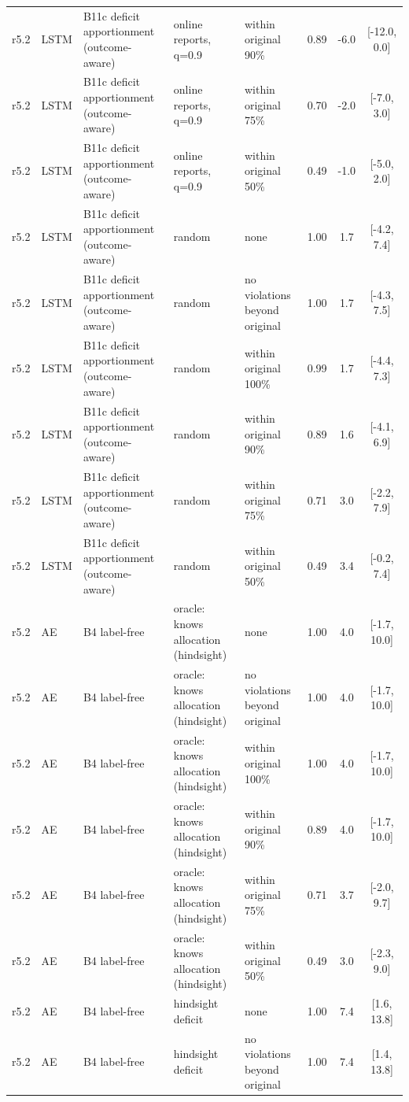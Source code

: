 \documentclass[10pt,onecolumn,letterpaper]{article}
\begin{document}
\begin{longtable}{lllp{4.2cm}p{3.4cm}ccc}
r5.2 & LSTM & B11c deficit apportionment (outcome-aware) & online reports, q=0.9 & within original 90\% & 0.89 & -6.0 & [-12.0, 0.0] \\
r5.2 & LSTM & B11c deficit apportionment (outcome-aware) & online reports, q=0.9 & within original 75\% & 0.70 & -2.0 & [-7.0, 3.0] \\
r5.2 & LSTM & B11c deficit apportionment (outcome-aware) & online reports, q=0.9 & within original 50\% & 0.49 & -1.0 & [-5.0, 2.0] \\
r5.2 & LSTM & B11c deficit apportionment (outcome-aware) & random & none & 1.00 & 1.7 & [-4.2, 7.4] \\
r5.2 & LSTM & B11c deficit apportionment (outcome-aware) & random & no violations beyond original & 1.00 & 1.7 & [-4.3, 7.5] \\
r5.2 & LSTM & B11c deficit apportionment (outcome-aware) & random & within original 100\% & 0.99 & 1.7 & [-4.4, 7.3] \\
r5.2 & LSTM & B11c deficit apportionment (outcome-aware) & random & within original 90\% & 0.89 & 1.6 & [-4.1, 6.9] \\
r5.2 & LSTM & B11c deficit apportionment (outcome-aware) & random & within original 75\% & 0.71 & 3.0 & [-2.2, 7.9] \\
r5.2 & LSTM & B11c deficit apportionment (outcome-aware) & random & within original 50\% & 0.49 & 3.4 & [-0.2, 7.4] \\
r5.2 & AE & B4 label-free & oracle: knows allocation (hindsight) & none & 1.00 & 4.0 & [-1.7, 10.0] \\
r5.2 & AE & B4 label-free & oracle: knows allocation (hindsight) & no violations beyond original & 1.00 & 4.0 & [-1.7, 10.0] \\
r5.2 & AE & B4 label-free & oracle: knows allocation (hindsight) & within original 100\% & 1.00 & 4.0 & [-1.7, 10.0] \\
r5.2 & AE & B4 label-free & oracle: knows allocation (hindsight) & within original 90\% & 0.89 & 4.0 & [-1.7, 10.0] \\
r5.2 & AE & B4 label-free & oracle: knows allocation (hindsight) & within original 75\% & 0.71 & 3.7 & [-2.0, 9.7] \\
r5.2 & AE & B4 label-free & oracle: knows allocation (hindsight) & within original 50\% & 0.49 & 3.0 & [-2.3, 9.0] \\
r5.2 & AE & B4 label-free & hindsight deficit & none & 1.00 & 7.4 & [1.6, 13.8] \\
r5.2 & AE & B4 label-free & hindsight deficit & no violations beyond original & 1.00 & 7.4 & [1.4, 13.8] \\

\end{longtable}
\end{document}
